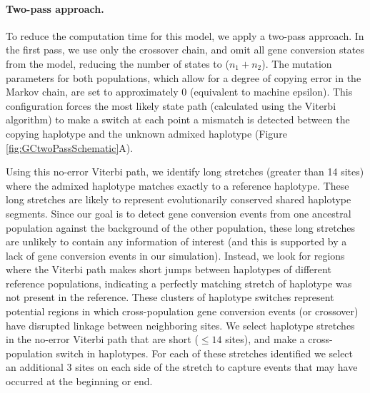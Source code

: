 \paragraph*{Two-pass approach.}
To reduce the computation time for this model, we apply a two-pass approach.
In the first pass, we use only the crossover chain, and omit all gene conversion states from the model, reducing the number of states to ($n_1+n_2$).
The mutation parameters for both populations, which allow for a degree of copying error in the Markov chain, are set to approximately 0 (equivalent to machine epsilon).
This configuration forces the most likely state path (calculated using the Viterbi algorithm) to make a switch at each point a mismatch is detected between the copying haplotype and the unknown admixed haplotype (Figure \ref{fig:GCtwoPassSchematic}A).

Using this no-error Viterbi path, we identify long stretches (greater than 14 sites) where the admixed haplotype matches exactly to a reference haplotype.
These long stretches are likely to represent evolutionarily conserved shared haplotype segments.
Since our goal is to detect gene conversion events from one ancestral population against the background of the other population, these long stretches are unlikely to contain any information of interest (and this is supported by a lack of gene conversion events in our simulation).  
Instead, we look for regions where the Viterbi path makes short jumps between haplotypes of different reference populations, indicating a perfectly matching stretch of haplotype was not present in the reference.
These clusters of haplotype switches represent potential regions in which cross-population gene conversion events (or crossover) have disrupted linkage between neighboring sites.
We select haplotype stretches in the no-error Viterbi path that are short ($\le 14$ sites), and make a cross-population switch in haplotypes. %
For each of these stretches identified we select an additional 3 sites on each side of the stretch to capture events that may have occurred at the beginning or end.

